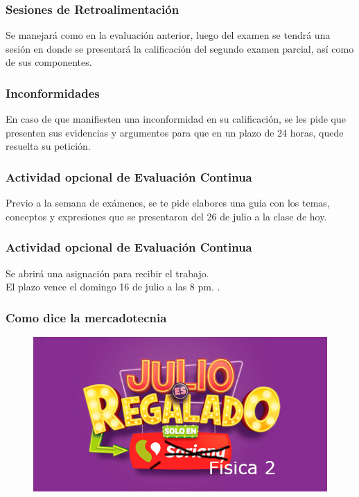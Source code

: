 \documentclass[14pt]{beamer}
\begin{document}
\begin{frame}
\frametitle{Sesiones de Retroalimentación}
Se manejará como en la evaluación anterior, luego del examen se tendrá una sesión en donde se presentará la calificación del segundo examen parcial, así como de sus componentes.
\end{frame}
\begin{frame}
\frametitle{Inconformidades}
En caso de que manifiesten una inconformidad en su calificación, se les pide que presenten sus evidencias y argumentos para que en un plazo de 24 horas, quede resuelta su petición.
\end{frame}
\begin{frame}
\frametitle{Actividad opcional de Evaluación Continua}
Previo a la semana de exámenes, se te pide elabores  una guía con los temas, conceptos y expresiones que se presentaron del 26 de julio a la clase de hoy.
\end{frame}
\begin{frame}
\frametitle{Actividad opcional de Evaluación Continua}
Se abrirá una asignación para recibir el trabajo.
\\
\bigskip
\pause
El plazo vence el domingo 16 de julio a las 8 pm. .
\end{frame}
\begin{frame}
\frametitle{Como dice la mercadotecnia}
\begin{figure}
    \centering
    \includegraphics[scale=0.5]{Imagenes/Julio_Regalado.png}
\end{figure}
\end{frame}
\end{document}

